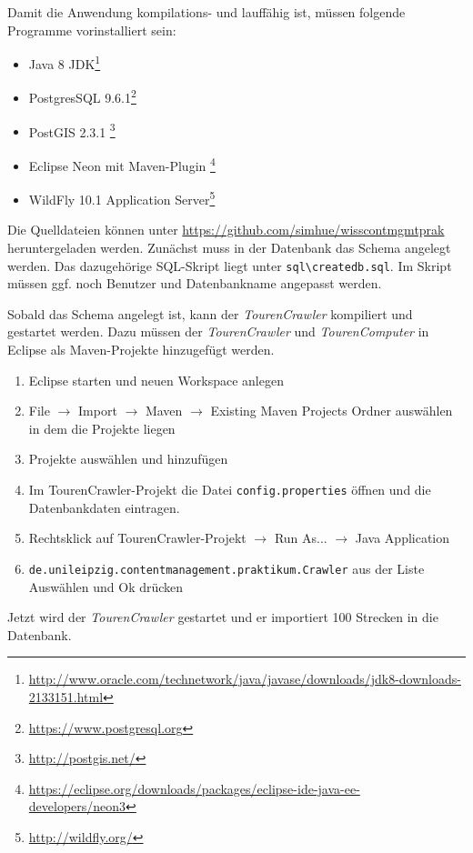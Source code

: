 \documentclass[a4paper,11pt,utf8]{scrartcl}
\begin{document}
Damit die Anwendung kompilations- und lauffähig ist, müssen folgende Programme vorinstalliert sein:

\begin{itemize}
	\item Java 8 JDK\footnote{\url{http://www.oracle.com/technetwork/java/javase/downloads/jdk8-downloads-2133151.html}}
	\item PostgresSQL 9.6.1\footnote{\url{https://www.postgresql.org}}
	\item PostGIS 2.3.1 \footnote{\url{http://postgis.net/}}
	\item Eclipse Neon mit Maven-Plugin \footnote{\url{https://eclipse.org/downloads/packages/eclipse-ide-java-ee-developers/neon3}}
	\item WildFly 10.1 Application Server\footnote{\url{http://wildfly.org/}}
\end{itemize}

Die Quelldateien können unter \url{https://github.com/simhue/wisscontmgmtprak} heruntergeladen werden. Zunächst muss in der Datenbank das Schema angelegt werden. Das dazugehörige SQL-Skript liegt unter \texttt{sql\textbackslash{}createdb.sql}. Im Skript müssen ggf. noch Benutzer und Datenbankname angepasst werden. 

Sobald das Schema angelegt ist, kann der \textit{TourenCrawler} kompiliert und gestartet werden. Dazu müssen der \textit{TourenCrawler} und \textit{TourenComputer} in Eclipse als Maven-Projekte hinzugefügt werden. 

\begin{enumerate}
	\item Eclipse starten und neuen Workspace anlegen
	\item File $\rightarrow$ Import $\rightarrow$ Maven $\rightarrow$ Existing Maven Projects  Ordner auswählen in dem die Projekte liegen
	\item Projekte auswählen und hinzufügen
	\item Im TourenCrawler-Projekt die Datei \texttt{config.properties} öffnen und die Datenbankdaten eintragen.
	\item Rechtsklick auf TourenCrawler-Projekt $\rightarrow$ Run As... $\rightarrow$ Java Application
	\item \texttt{de.unileipzig.contentmanagement.praktikum.Crawler} aus der Liste Auswählen und Ok drücken
\end{enumerate}

Jetzt wird der \textit{TourenCrawler} gestartet und er importiert 100 Strecken in die Datenbank.
\end{document}
